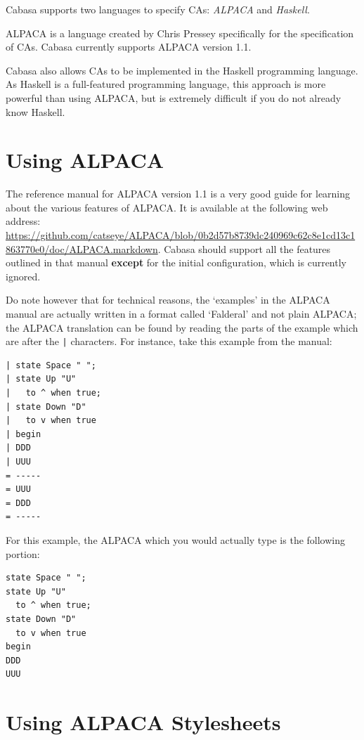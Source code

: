 \documentclass[oneside,a4paper]{memoir}
\begin{document}
Cabasa supports two languages to specify CAs: \emph{ALPACA} and \emph{Haskell}.

ALPACA is a language created by Chris Pressey specifically for the specification of CAs.
Cabasa currently supports ALPACA version 1.1.

Cabasa also allows CAs to be implemented in the Haskell programming language.
As Haskell is a full-featured programming language, this approach is more powerful than using ALPACA,
  but is extremely difficult if you do not already know Haskell.

\section{Using ALPACA}
\label{sec:usalp}

The reference manual for ALPACA version 1.1 is a very good guide for learning about the various features of ALPACA.
It is available at the following web address: \url{https://github.com/catseye/ALPACA/blob/0b2d57b8739dc240969c62c8e1cd13c1863770e0/doc/ALPACA.markdown}.
Cabasa should support all the features outlined in that manual
  \textbf{except} for the initial configuration, which is currently ignored.

Do note however that for technical reasons\footnotemark,
  the `examples' in the ALPACA manual are actually written in a format called `Falderal' and not plain ALPACA;
  the ALPACA translation can be found by reading the parts of the example which are after the \texttt{|} characters.
For instance, take this example from the manual:

\begin{verbatim}
| state Space " ";
| state Up "U"
|   to ^ when true;
| state Down "D"
|   to v when true
| begin
| DDD
| UUU
= -----
= UUU
= DDD
= -----
\end{verbatim}

For this example, the ALPACA which you would actually type is the following portion:

\begin{verbatim}
state Space " ";
state Up "U"
  to ^ when true;
state Down "D"
  to v when true
begin
DDD
UUU
\end{verbatim}


\section{Using ALPACA Stylesheets}
\label{sec:stys}
\end{document}
